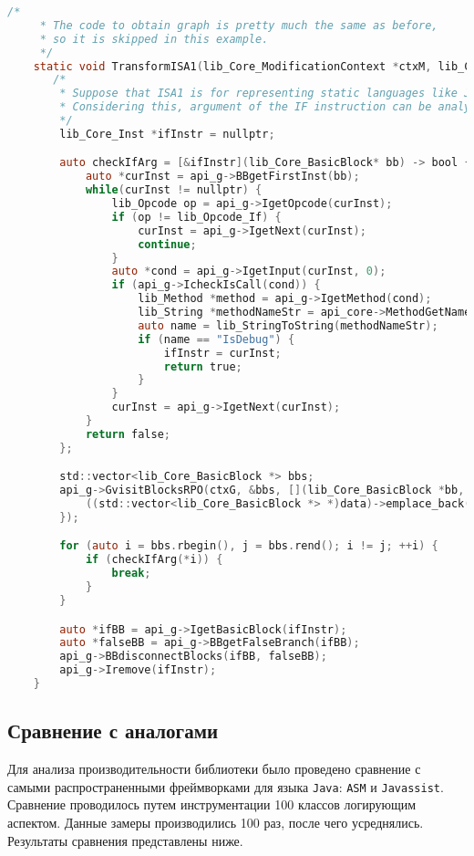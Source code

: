 \begin{lstlisting}[language=C, label=lst:]
    /*
     * The code to obtain graph is pretty much the same as before,
     * so it is skipped in this example.
     */
    static void TransformISA1(lib_Core_ModificationContext *ctxM, lib_Core_Function* f, lib_Core_Graph* g) {
       /*
        * Suppose that ISA1 is for representing static languages like Java.
        * Considering this, argument of the IF instruction can be analyzed quite simply.
        */
        lib_Core_Inst *ifInstr = nullptr;

        auto checkIfArg = [&ifInstr](lib_Core_BasicBlock* bb) -> bool {
            auto *curInst = api_g->BBgetFirstInst(bb);
            while(curInst != nullptr) {
                lib_Opcode op = api_g->IgetOpcode(curInst);
                if (op != lib_Opcode_If) {
                    curInst = api_g->IgetNext(curInst);
                    continue;
                }
                auto *cond = api_g->IgetInput(curInst, 0);
                if (api_g->IcheckIsCall(cond)) {
                    lib_Method *method = api_g->IgetMethod(cond);
                    lib_String *methodNameStr = api_core->MethodGetName(method);
                    auto name = lib_StringToString(methodNameStr);
                    if (name == "IsDebug") {
                        ifInstr = curInst;
                        return true;
                    }
                }
                curInst = api_g->IgetNext(curInst);
            }
            return false;
        };

        std::vector<lib_Core_BasicBlock *> bbs;
        api_g->GvisitBlocksRPO(ctxG, &bbs, [](lib_Core_BasicBlock *bb, void *data) {
            ((std::vector<lib_Core_BasicBlock *> *)data)->emplace_back(bb);
        });

        for (auto i = bbs.rbegin(), j = bbs.rend(); i != j; ++i) {
            if (checkIfArg(*i)) {
                break;
            }
        }

        auto *ifBB = api_g->IgetBasicBlock(ifInstr);
        auto *falseBB = api_g->BBgetFalseBranch(ifBB);
        api_g->BBdisconnectBlocks(ifBB, falseBB);
        api_g->Iremove(ifInstr);
    }
\end{lstlisting}

\subsection{Сравнение с аналогами}

Для анализа производительности библиотеки было проведено сравнение с самыми распространенными фреймворками для языка \texttt{Java}: \texttt{ASM} и \texttt{Javassist}. Сравнение проводилось путем инструментации 100 классов логирующим аспектом. Данные замеры производились 100 раз, после чего усреднялись. Результаты сравнения представлены ниже.

